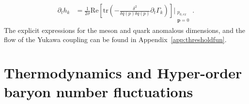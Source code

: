 \documentclass[%
reprint,
superscriptaddress,
showpacs,preprintnumbers,
 amsmath,amssymb,
 aps,
prd,
]{revtex4-1}
\def\app#1{Appendix~\ref{#1}}
\begin{document}
%
\begin{align}
  \partial_t h_k&=\frac{1}{2 \sigma}\mathrm{Re}\left[\mathrm{tr}\left(-\frac{\delta^2}{\delta\bar{q}(p)
            \delta q(p)}\partial_t \Gamma_k\right)\right]\Bigg|_{\substack{p_{0,ex}\\ \bm{p}=0}}\,.  \label{eq:dth}
\end{align}
%
The explicit expressions for the meson and quark anomalous dimensions, and the flow of the Yukawa coupling can be found in \app{app:thresholdfun}.


\section{Thermodynamics and Hyper-order baryon number fluctuations}
\label{sec:hyper-fluc}
\end{document}
